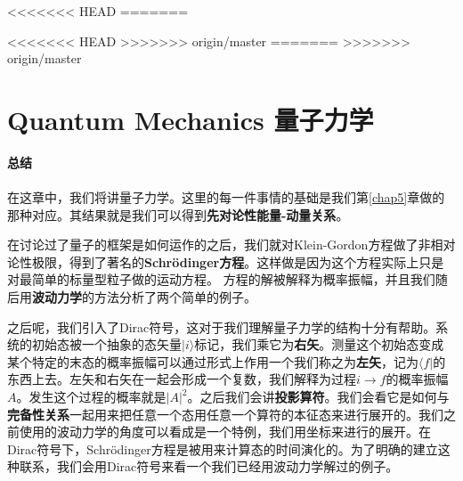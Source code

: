 
<<<<<<< HEAD
=======

<<<<<<< HEAD
>>>>>>> origin/master
=======
>>>>>>> origin/master
\def\pmm{\begin{pmatrix}}
\def\pmme{\end{pmatrix}}

\chapter[量子力学]{Quantum Mechanics 量子力学}\label{chap8}

{\Huge\bf 总结\\ \ \\}
在这章中，我们将讲量子力学。这里的每一件事情的基础是我们第\ref{chap5}章做的那种对应。其结果就是我们可以得到{\bf 先对论性能量-动量关系}。

在讨论过了量子的框架是如何运作的之后，我们就对Klein-Gordon方程做了非相对论性极限，得到了著名的{\bf Schrödinger方程}。这样做是因为这个方程实际上只是对最简单的标量型粒子做的运动方程。
方程的解被解释为概率振幅，并且我们随后用{\bf 波动力学}的方法分析了两个简单的例子。

之后呢，我们引入了{Dirac符号}，这对于我们理解量子力学的结构十分有帮助。系统的初始态被一个抽象的态矢量$|i\rangle$标记，我们乘它为{\bf 右矢}。测量这个初始态变成某个特定的末态的概率振幅可以通过形式上作用一个我们称之为{\bf 左矢}，记为$\langle f|$的东西上去。左矢和右矢在一起会形成一个复数，我们解释为过程$i\to f$的概率振幅$A$。发生这个过程的概率就是$|A|^2$。之后我们会讲{\bf 投影算符}。我们会看它是如何与{\bf 完备性关系}一起用来把任意一个态用任意一个算符的本征态来进行展开的。我们之前使用的波动力学的角度可以看成是一个特例，我们用坐标来进行的展开。在Dirac符号下，Schrödinger方程是被用来计算态的时间演化的。为了明确的建立这种联系，我们会用Dirac符号来看一个我们已经用波动力学解过的例子。

